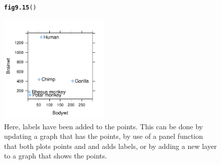\documentclass[12pt, a4paper,  BCOR=8.25mm, DIV=15]{scrartcl}\usepackage[]{graphicx}\usepackage[]{color}
\makeatletter
\newcommand{\hlstd}[1]{\textcolor[rgb]{0.345,0.345,0.345}{#1}}%
\newcommand{\hlkwd}[1]{\textcolor[rgb]{0.737,0.353,0.396}{\textbf{#1}}}%
\newenvironment{kframe}{%
 \def\at@end@of@kframe{}%
 \ifinner\ifhmode%
  \def\at@end@of@kframe{\end{minipage}}%
  \begin{minipage}{\columnwidth}%
 \fi\fi%
 \def\FrameCommand##1{\hskip\@totalleftmargin \hskip-\fboxsep
 \colorbox{shadecolor}{##1}\hskip-\fboxsep
     \hskip-\linewidth \hskip-\@totalleftmargin \hskip\columnwidth}%
 \MakeFramed {\advance\hsize-\width
   \@totalleftmargin\z@ \linewidth\hsize
   \@setminipage}}%
 {\par\unskip\endMakeFramed%
 \at@end@of@kframe}
\newenvironment{knitrout}{}{} %
\makeatother
\begin{document}
\begin{figure}[ht]
\begin{knitrout}
\color{fgcolor}\begin{kframe}
\begin{alltt}
\hlkwd{fig9.15}\hlstd{()}
\end{alltt}
\end{kframe}

{\centering \includegraphics[width=0.47\textwidth]{figs/gph-fig9_15e-1} 

}



\end{knitrout}
\caption{Here, labels have been added to the points. This can be
  done by updating a graph that has the points, by use of a panel
  function that both plots points and and adds labels, or by adding a
  new layer to a graph that shows the points.}\label{fig:layer}
\end{figure}

\addtocounter{figure}{1}
\end{document}
